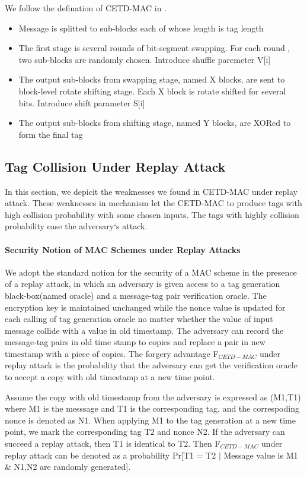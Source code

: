 \documentclass{article}
\begin{document}
We follow the defination of CETD-MAC in \cite{keylist}. 
\begin{itemize}
	\item Message is splitted to sub-blocks each of whose length is tag length
	\item The first stage is several rounds of bit-segment swapping. For each round , two sub-blocks are randomly chosen. Introduce shuffle paremeter V[i]
	\item The output sub-blocks from swapping stage, named X blocks, are sent to block-level rotate shifting stage. Each X block is rotate shifted for several bits. Introduce shift parameter S[i]
	\item The output sub-blocks from shifting stage, named Y blocks, are XORed to form the final tag
\end{itemize}


\subsection{Tag Collision Under Replay Attack}
In this section, we depicit the weaknesses we found in CETD-MAC under replay attack. These weaknesses in mechanism let the CETD-MAC to produce tags with high collision probability with some chosen inputs. The tags with highly collision probability ease the adversary`s attack.
\paragraph{Security Notion of MAC Schemes under Replay Attacks}
We adopt the standard notion for the security of a MAC scheme in the presence of a replay attack, in which an adversary is given  access to a tag generation black-box(named oracle) and a message-tag pair verification oracle. The encryption key is maintained unchanged while the nonce value is updated for each calling of tag generation oracle no matter whether the value of input message collide with a value in old timestamp. The adversary can record the message-tag pairs in old time stamp to copies and replace a pair in new timestamp with a piece of copies. The forgery advantage F$_{CETD-MAC}$ under replay attack is the probability that the adversary can get the verification oracle to accept a copy with old timestamp at a new time point. 

Assume the copy with old timestamp from the adversary is expressed as (M1,T1) where M1 is the messsage and T1 is the corresponding tag, and the correspoding nonce is denoted as N1. When applying M1 to the tag generation at a new time point, we mark the corresponding tag T2 and nonce N2. If the adversary can succeed a replay attack, then T1 is identical to T2.
Then F$_{CETD-MAC}$ under replay attack can be denoted as a probability Pr[T1 = T2  $\mid$ Message value is M1 \& N1,N2 are randomly generated]. 
\end{document}

